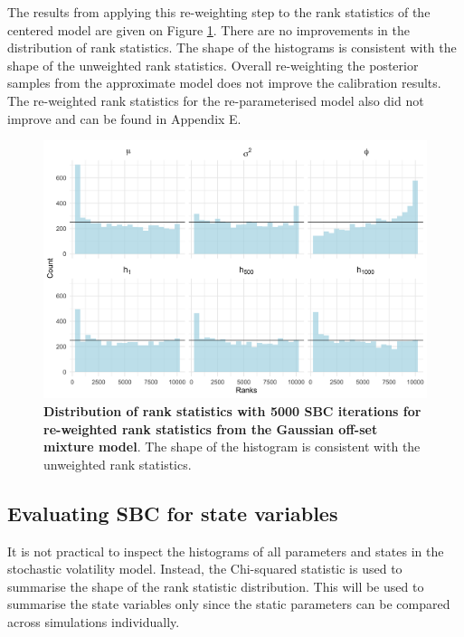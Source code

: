 \documentclass[12pt, a4paper]{article}
\begin{document}
    The results from applying this re-weighting step to the rank statistics of the centered model are given on Figure \ref{fig:reweight5k}. There are no improvements in the distribution of rank statistics. The shape of the histograms is consistent with the shape of the unweighted rank statistics. Overall re-weighting the posterior samples from the approximate model does not improve the calibration results. The re-weighted rank statistics for the re-parameterised model also did not improve and can be found in Appendix E.

    \begin{figure}[H]
        \centering
        \includegraphics[scale=0.1]{results/weighted_ksc_cp_5k.png}
        \caption{\textbf{Distribution of rank statistics with 5000 SBC iterations for re-weighted rank statistics from the Gaussian off-set mixture model}. The shape of the histogram is consistent with the unweighted rank statistics.}
        \label{fig:reweight5k}
    \end{figure}

    \subsection{Evaluating SBC for state variables}
    It is not practical to inspect the histograms of all parameters and states in the stochastic volatility model. Instead, the Chi-squared statistic is used to summarise the shape of the rank statistic distribution. This will be used to summarise the state variables only since the static parameters can be compared across simulations individually. 
\end{document}
